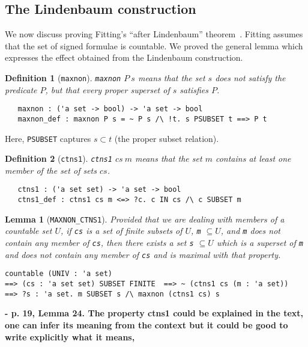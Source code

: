\documentclass[a4paper]{article}
\newtheorem{lemma}{Lemma}
\newtheorem{definition}{Definition}
\begin{document}
\subsection{The Lindenbaum construction}

We now discuss proving Fitting's ``after
Lindenbaum'' theorem~\cite[Theorem~1]{fitting-dual-tableau}. 
Fitting assumes that the
set of signed formulae is countable.
%
We proved the general lemma which expresses 
the effect obtained from the Lindenbaum construction.

\begin{definition}[\texttt{maxnon}]\label{maxnon}
\texttt{maxnon} $P\ s$ means that the set $s$ does not satisfy the 
predicate $P$, but that every proper superset of $s$ satisfies $P$.
\begin{verbatim}
   maxnon : ('a set -> bool) -> 'a set -> bool
   maxnon_def : maxnon P s = ~ P s /\ !t. s PSUBSET t ==> P t 
\end{verbatim}
\end{definition}

Here, \texttt{PSUBSET} captures $s \subset t$ (the proper subset relation).

\begin{definition}[\texttt{ctns1}]\label{ctns1}
\texttt{ctns1} $cs\ m$ means that the set $m$ contains at least one member
of the set of sets $cs$.
\begin{verbatim}
   ctns1 : ('a set set) -> 'a set -> bool
   ctns1_def : ctns1 cs m <=> ?c. c IN cs /\ c SUBSET m
\end{verbatim}
\end{definition}

\begin{lemma}[\texttt{MAXNON\_CTNS1}] \label{MAXNON-CTNS1} Provided
  that we are dealing with members of a countable set $U$, if
  \texttt{cs} is a set of finite subsets of $U$,
  \texttt{m} $\subseteq U$, and \texttt{m}
  does not contain any member of \texttt{cs},
  then there exists a set \texttt{s} $\subseteq U$ 
  which is a superset of \texttt{m} and does not contain any
  member of \texttt{cs} and is maximal with that property.
\begin{verbatim}
countable (UNIV : 'a set) 
==> (cs : 'a set set) SUBSET FINITE  ==> ~ (ctns1 cs (m : 'a set)) 
==> ?s : 'a set. m SUBSET s /\ maxnon (ctns1 cs) s
\end{verbatim}
\end{lemma}

\textbf{- p. 19, Lemma 24. The property ctns1 could be explained in the text,
one can infer its meaning from the context but it could be good
to write explicitly what it means,
}
\end{document}
